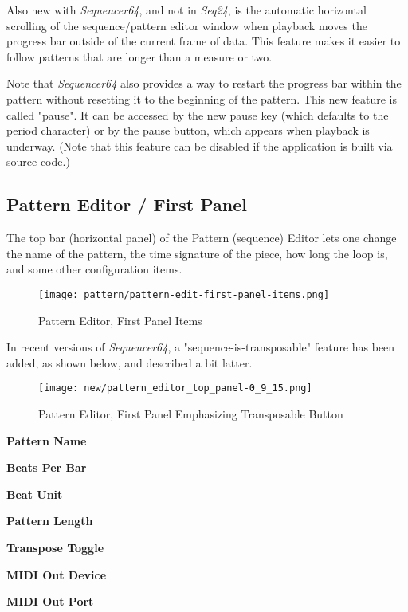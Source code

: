   Also new with \textsl{Sequencer64}, and not in \textsl{Seq24}, is the
   automatic horizontal scrolling of the sequence/pattern editor window when
   playback moves the progress bar outside of the current frame of data.  This
   feature makes it easier to follow patterns that are longer than a measure or
   two.
   
   Note that \textsl{Sequencer64} also provides a way to restart the progress
   bar within the pattern without resetting it to the beginning of the pattern.
    This new feature is called "pause".  It can be accessed by the
   new pause key (which defaults to the period character) or by the pause
   button, which appears when playback is underway.  (Note that this feature
   can be disabled if the application is built via source code.)

\subsection{Pattern Editor / First Panel}
\label{subsec:seq64_pattern_editor_first}

   The top bar (horizontal panel) of the Pattern (sequence) Editor
   lets one change the name of
   the pattern, the time signature of the piece, how long the loop is, and
   some other configuration items.

\begin{figure}[H]
   \centering 
   \texttt{[image: pattern/pattern-edit-first-panel-items.png]}
   \caption{Pattern Editor, First Panel Items}
   \label{fig:pattern_editor_first_panel_items}
\end{figure}

   In recent versions of \textsl{Sequencer64}, a "sequence-is-transposable"
   feature has been added, as shown below, and described a bit latter.

\begin{figure}[H]
   \centering 
   \texttt{[image: new/pattern\_editor\_top\_panel-0\_9\_15.png]}
   \caption{Pattern Editor, First Panel Emphasizing Transposable Button}
   \label{fig:pattern_editor_first_panel_items}
\end{figure}

   \begin{enumber}
      \item \textbf{Pattern Name}
      \item \textbf{Beats Per Bar}
      \item \textbf{Beat Unit}
      \item \textbf{Pattern Length}
      \item \textbf{Transpose Toggle}
      \item \textbf{MIDI Out Device}
      \item \textbf{MIDI Out Port}
   \end{enumber}

